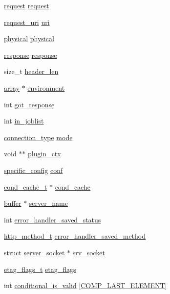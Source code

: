 \begin{DoxyCompactItemize}
\hyperlink{structrequest}{request} \hyperlink{structconnection_a4b3fe80fe7d59788f44466d04077b11a}{request}
\item 
\hyperlink{structrequest__uri}{request\-\_\-uri} \hyperlink{structconnection_a92531d3094bf5ce3af5107506702067c}{uri}
\item 
\hyperlink{structphysical}{physical} \hyperlink{structconnection_acd39e26d871845fac20b85ef5e3823ef}{physical}
\item 
\hyperlink{structresponse}{response} \hyperlink{structconnection_abe43f9dc2787128011e6510fe4673081}{response}
\item 
size\-\_\-t \hyperlink{structconnection_a754a1fa8b70b9bc38d1dd924d379c34f}{header\-\_\-len}
\item 
\hyperlink{structarray}{array} $\ast$ \hyperlink{structconnection_accccbe3ddcf8b246d8d6ee93c84e6c9b}{environment}
\item 
int \hyperlink{structconnection_a31bce9025d3e04d9df2e5876f4f1868a}{got\-\_\-response}
\item 
int \hyperlink{structconnection_a739dd4884f14ad354d8f0db35ae12efb}{in\-\_\-joblist}
\item 
\hyperlink{base_8h_acdf0efffcd30d2dd47aa36b78d3398a7}{connection\-\_\-type} \hyperlink{structconnection_a678265f403b80798cd979f7e8108cdaf}{mode}
\item 
void $\ast$$\ast$ \hyperlink{structconnection_a50b86ed1f96cd78db67d7178d27395ff}{plugin\-\_\-ctx}
\item 
\hyperlink{structspecific__config}{specific\-\_\-config} \hyperlink{structconnection_a64fd7626accd6bfd28525e9d17adf612}{conf}
\item 
\hyperlink{structcond__cache__t}{cond\-\_\-cache\-\_\-t} $\ast$ \hyperlink{structconnection_a84fcfd608740374ca944491f11bee7c6}{cond\-\_\-cache}
\item 
\hyperlink{structbuffer}{buffer} $\ast$ \hyperlink{structconnection_a1733a3bc86e073fd98e2dac8e2c7ed0f}{server\-\_\-name}
\item 
int \hyperlink{structconnection_a6dd3ddb643153f1d6e7946d1ac973135}{error\-\_\-handler\-\_\-saved\-\_\-status}
\item 
\hyperlink{keyvalue_8h_a2fd930fba66817097e73ba9b75800eb2}{http\-\_\-method\-\_\-t} \hyperlink{structconnection_ad631932dd50684e43436654946c5951f}{error\-\_\-handler\-\_\-saved\-\_\-method}
\item 
struct \hyperlink{structserver__socket}{server\-\_\-socket} $\ast$ \hyperlink{structconnection_a3735b8160fe578295774457191c06244}{srv\-\_\-socket}
\item 
\hyperlink{etag_8h_a75c43c1ab132717944031de235cf76c3}{etag\-\_\-flags\-\_\-t} \hyperlink{structconnection_a2251cd32b04d7203e44954d944b589ce}{etag\-\_\-flags}
\item 
int \hyperlink{structconnection_adb2d47b554fdf1d0e502a98b2bb81661}{conditional\-\_\-is\-\_\-valid} \mbox{[}\hyperlink{array_8h_a70eba8cb401a078bd3a4b284e5ab6b83a53c3dd05cbda10399ad710ffa1e99eb3}{C\-O\-M\-P\-\_\-\-L\-A\-S\-T\-\_\-\-E\-L\-E\-M\-E\-N\-T}\mbox{]}
\end{DoxyCompactItemize}


